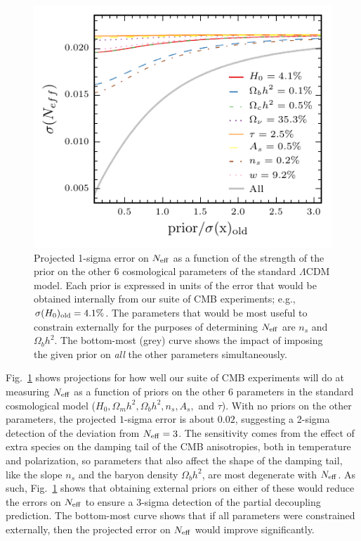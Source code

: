 \documentclass[aps,prd,reprint,superscriptaddress]{revtex4-1}
\newcommand{\reffig}[1]{Fig.~\ref{fig:#1}}
\begin{document}
\begin{figure}[htbp]
\begin{center}
\includegraphics{prior_massless_neutrinos_snow_mass.pdf}
\caption{Projected 1-sigma error on $N_{\rm eff}$ as a function of the strength of the prior on the other 6 cosmological parameters of the standard $\Lambda$CDM model. Each prior is expressed in units of the error that would be obtained internally from our suite of CMB experiments; e.g., $\sigma(H_0)_{\rm old}=4.1\%$. The parameters that would be most useful to constrain externally for the purposes of determining $N_{\rm eff}$ are $n_s$ and $\Omega_bh^2$. The bottom-most (grey) curve shows the impact of imposing the given prior on {\it all} the other parameters simultaneously.}
\label{fig:prior_massless_neutrinos}
\end{center}
\end{figure}

\reffig{prior_massless_neutrinos} shows projections for how well our suite of CMB experiments will do at measuring $N_{\rm eff}$ as a function of priors on the other 6 parameters in the standard cosmological model ($H_0, \Omega_mh^2,\Omega_bh^2, n_s, A_s,$ and $\tau$). With no priors on the other parameters, the projected $1$-sigma error is  about $0.02$, suggesting a 2-sigma detection of the deviation from $N_{\rm eff}=3$. The sensitivity comes from the effect of extra species on the damping tail of the CMB anisotropies, both in temperature and polarization, so parameters that also affect the shape of the damping tail, like the slope $n_s$ and the baryon density $\Omega_bh^2$, are most degenerate with $N_{\rm eff}$. As such, \reffig{prior_massless_neutrinos} shows that obtaining external priors on either of these would reduce the errors on $N_{\rm eff}$ to ensure a 3-sigma detection of the partial decoupling prediction. The bottom-most curve shows that if all parameters were constrained externally, then the projected error on $N_{\rm eff}$ would improve significantly.
\end{document}
